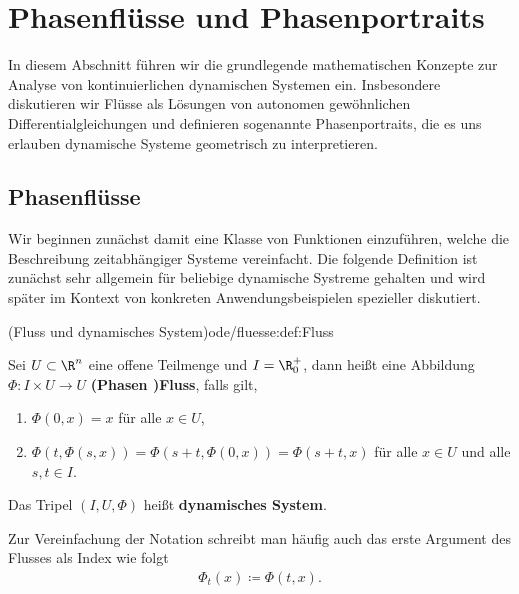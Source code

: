 \documentclass[letterpaper,10pt,german]{jupyterBook}
\begin{document}
\section{Phasenflüsse und Phasenportraits}
\label{\detokenize{ode/fluesse:phasenflusse-und-phasenportraits}}\label{\detokenize{ode/fluesse:s-fluesse}}\label{\detokenize{ode/fluesse::doc}}
\par
In diesem Abschnitt führen wir die grundlegende mathematischen Konzepte zur Analyse von kontinuierlichen dynamischen Systemen ein. Insbesondere diskutieren wir Flüsse als Lösungen von autonomen gewöhnlichen Differentialgleichungen und definieren sogenannte Phasenportraits, die es uns erlauben dynamische Systeme geometrisch zu interpretieren.


\subsection{Phasenflüsse}
\label{\detokenize{ode/fluesse:phasenflusse}}
\par
Wir beginnen zunächst damit eine Klasse von Funktionen einzuführen, welche die Beschreibung zeitabhängiger Systeme vereinfacht.
Die folgende Definition ist zunächst sehr allgemein für beliebige dynamische Systreme gehalten und wird später im Kontext von konkreten Anwendungsbeispielen spezieller diskutiert.
\begin{definition}{(Fluss und dynamisches System)}{ode/fluesse:def:Fluss}



\par
Sei \(U \subset \R^n\) eine offene Teilmenge und \(I=\R^+_0\), dann heißt eine Abbildung \(\Phi:I\times U\rightarrow U\) \textbf{(Phasen )Fluss}, falls gilt,
\begin{enumerate}

\item {} 
\par
\(\Phi(0, x) = x\) für alle \(x\in U\),

\item {} 
\par
\(\Phi(t, \Phi(s,x)) = \Phi(s + t, \Phi(0, x)) = \Phi(s + t, x)\) für alle \(x\in U\) und alle \(s,t\in I\).

\end{enumerate}

\par
Das Tripel \((I, U, \Phi)\) heißt \textbf{dynamisches System}.

\par
Zur Vereinfachung der Notation schreibt man häufig auch das erste Argument des Flusses als Index wie folgt
\begin{align*}
\Phi_t(x) \coloneqq \Phi(t, x).
\end{align*}\end{definition}
\end{document}
